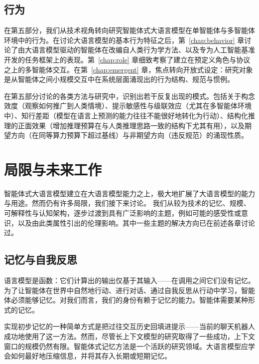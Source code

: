 \subsection{行为}
在第五部分，我们从技术视角转向研究智能体式大语言模型在单智能体与多智能体环境中的行为。在讨论大语言模型的基本行为特征之后，第~\ref{chap:behavior} 章讨论了由大语言模型驱动的智能体在改编自人类行为学方法、以及专为人工智能基准开发的任务框架上的表现。第~\ref{chap:role} 章细致考察了建立在预定义角色与协议之上的多智能体交互。在第~\ref{chap:emergent} 章，焦点转向开放式设定：研究对象是从智能体之间小规模交互中在系统层面涌现出的行为结构、规范与惯例。

在第五部分讨论的各类方法与研究中，识别出若干反复出现的模式。包括关于构念效度（观察如何推广到人类情境）、提示敏感性与级联效应（尤其在多智能体环境中）、知行差距（模型在语言上预测的能力往往不能很好地转化为行动）、结构化推理的正面效果（增加推理预算在与人类推理思路一致的结构下尤其有用），以及期望方向（在同等算力预算下超过基线）与非期望方向（违反规范）的涌现性质。

\section{局限与未来工作}\label{sec:limitations}
智能体式大语言模型建立在大语言模型能力之上，极大地扩展了大语言模型的能力与用途。然而仍有许多局限，我们接下来讨论。
我们从较为技术的记忆、规模、可解释性与认知架构，逐步过渡到具有广泛影响的主题，例如可能的感受性或意识，以及由此类属性引出的伦理影响。其中一些主题的解决方向已在前述各章讨论过。

\subsection{记忆与自我反思}
语言模型是函数：它们计算出的输出仅基于其输入——在调用之间它们没有记忆。为了让智能体在世界中自然地行动、进行对话、通过自我反思从行动中学习，智能体必须能够记忆。对我们而言，我们的身份有赖于记忆的能力。智能体需要某种形式的记忆。

实现初步记忆的一种简单方式是把过往交互历史回填进提示——当前的聊天机器人成功地使用了这一方法。然而，尽管长上下文模型的研究取得了一些成功，上下文窗口的规模仍然有限。智能体式记忆方法是一个活跃的研究领域。大语言模型应学会如何最好地压缩信息，并将其存入长期或短期记忆。

